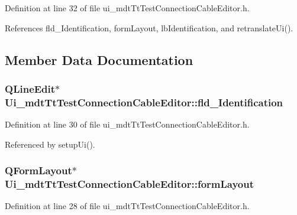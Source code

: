 Definition at line 32 of file ui\-\_\-mdt\-Tt\-Test\-Connection\-Cable\-Editor.\-h.



References fld\-\_\-\-Identification, form\-Layout, lb\-Identification, and retranslate\-Ui().



\subsection{Member Data Documentation}
\hypertarget{class_ui__mdt_tt_test_connection_cable_editor_a3c64a6ce2c1c3daa4ddcea32767daa1c}{
\subsubsection[{fld\-\_\-\-Identification}]{\setlength{\rightskip}{0pt plus 5cm}Q\-Line\-Edit$\ast$ Ui\-\_\-mdt\-Tt\-Test\-Connection\-Cable\-Editor\-::fld\-\_\-\-Identification}}\label{class_ui__mdt_tt_test_connection_cable_editor_a3c64a6ce2c1c3daa4ddcea32767daa1c}


Definition at line 30 of file ui\-\_\-mdt\-Tt\-Test\-Connection\-Cable\-Editor.\-h.



Referenced by setup\-Ui().

\hypertarget{class_ui__mdt_tt_test_connection_cable_editor_a982dc6b55ea260618506bae6016829b4}{
\subsubsection[{form\-Layout}]{\setlength{\rightskip}{0pt plus 5cm}Q\-Form\-Layout$\ast$ Ui\-\_\-mdt\-Tt\-Test\-Connection\-Cable\-Editor\-::form\-Layout}}\label{class_ui__mdt_tt_test_connection_cable_editor_a982dc6b55ea260618506bae6016829b4}


Definition at line 28 of file ui\-\_\-mdt\-Tt\-Test\-Connection\-Cable\-Editor.\-h.



